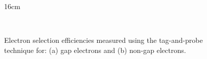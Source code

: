 \begin{figure}[hbtp]{16cm}
	\caption{Electron selection efficiencies measured using the tag-and-probe technique for: (a) gap electrons and (b) non-gap electrons.}
	\centering
	\\
	\label{fig:electron_selection_efficiency}
\end{figure}


